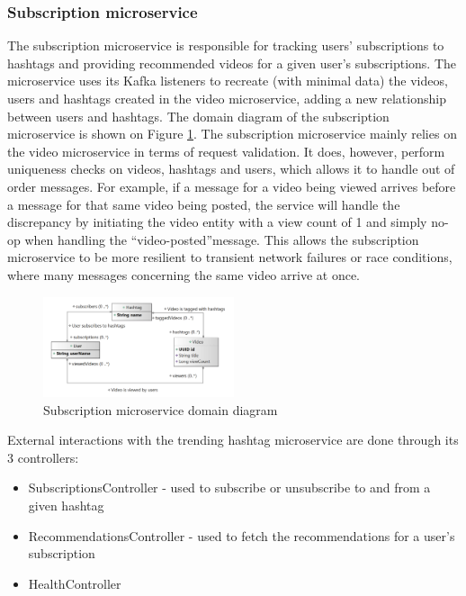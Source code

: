 \documentclass[parskip=full]{article}
\begin{document}
    \subsubsection{Subscription microservice}
    The subscription microservice is responsible for tracking users' subscriptions to hashtags and providing recommended videos for a given user's subscriptions.
    The microservice uses its Kafka listeners to recreate (with minimal data) the videos, users and hashtags created in the video
    microservice, adding a new relationship between users and hashtags.
    The domain diagram of the subscription microservice is shown on Figure \ref{fig:smDomain}.
    The subscription microservice mainly relies on the video microservice in terms of request validation.
    It does, however, perform uniqueness checks on videos, hashtags and users, which allows it to handle out of order messages.
    For example, if a message for a video being viewed arrives before a message for that same video being posted, the service will handle the discrepancy by initiating the video entity with a view count of 1 and simply no-op when handling the ``video-posted''message.
    This allows the subscription microservice to be more resilient to transient network failures or race conditions, where many messages concerning the same video arrive at once.

    \begin{figure}
        \includegraphics[width=0.5\textwidth]{sm-domain-diagram}
        \caption{Subscription microservice domain diagram}
        \label{fig:smDomain}
    \end{figure}

    External interactions with the trending hashtag microservice are done through its 3 controllers:

    \begin{itemize}
        \item SubscriptionsController - used to subscribe or unsubscribe to and from a given hashtag
        \item RecommendationsController - used to fetch the recommendations for a user's subscription
        \item HealthController
    \end{itemize}
\end{document}

